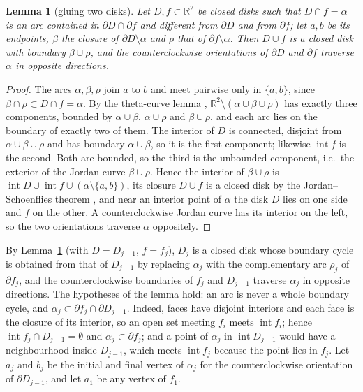 \documentclass[11pt,reqno]{amsart}
\newtheorem{lemma}[theorem]{Lemma}
\theoremstyle{definition}
\theoremstyle{remark}
\numberwithin{equation}{section}
\newcommand{\R}{\mathbb{R}}
\begin{document}
\begin{lemma}[gluing two disks]\label{lem:glue}
Let $D,f\subset\R^2$ be closed disks such that $D\cap f=\alpha$ is an arc contained in $\partial D\cap\partial f$ and different
from $\partial D$ and from $\partial f$; let $a,b$ be its endpoints, $\beta$ the closure of $\partial D\setminus\alpha$ and $\rho$
that of $\partial f\setminus\alpha$.  Then $D\cup f$ is a closed disk with boundary $\beta\cup\rho$, and the counterclockwise
orientations of $\partial D$ and $\partial f$ traverse $\alpha$ in opposite directions.
\end{lemma}
\begin{proof}
The arcs $\alpha,\beta,\rho$ join $a$ to $b$ and meet pairwise only in $\{a,b\}$, since $\beta\cap\rho\subset D\cap f=\alpha$.  By the
theta-curve lemma \cite[\S2.1]{MT}, $\R^2\setminus(\alpha\cup\beta\cup\rho)$ has exactly three components, bounded by $\alpha\cup\beta$,
$\alpha\cup\rho$ and $\beta\cup\rho$, and each arc lies on the boundary of exactly two of them.  The interior of $D$ is connected,
disjoint from $\alpha\cup\beta\cup\rho$ and has boundary $\alpha\cup\beta$, so it is the first component; likewise
$\operatorname{int}f$ is the second.  Both are bounded, so the third is the unbounded component, i.e.\ the exterior of the
Jordan curve $\beta\cup\rho$.  Hence the interior of $\beta\cup\rho$ is $\operatorname{int}D\cup\operatorname{int}f\cup(\alpha\setminus\{a,b\})$,
its closure $D\cup f$ is a closed disk by the Jordan--Schoenflies theorem \cite{Thomassen}, and near an interior point
of $\alpha$ the disk $D$ lies on one side and $f$ on the other.  A counterclockwise Jordan curve has its interior on the
left, so the two orientations traverse $\alpha$ oppositely.
\end{proof}

By Lemma~\ref{lem:glue} (with $D=D_{j-1}$, $f=f_j$), $D_j$ is a closed disk whose boundary cycle is obtained from that of
$D_{j-1}$ by replacing $\alpha_j$ with the complementary arc $\rho_j$ of $\partial f_j$, and the counterclockwise boundaries
of $f_j$ and $D_{j-1}$ traverse $\alpha_j$ in opposite directions.  The hypotheses of the lemma hold: an arc is never a whole boundary cycle, and $\alpha_j\subset\partial f_j\cap\partial D_{j-1}$.
Indeed, faces have disjoint interiors and each face is the closure of its interior, so an open set meeting $f_i$ meets
$\operatorname{int}f_i$; hence $\operatorname{int}f_j\cap D_{j-1}=\emptyset$ and $\alpha_j\subset\partial f_j$; and a point of $\alpha_j$ in
$\operatorname{int}D_{j-1}$ would have a neighbourhood inside $D_{j-1}$, which meets $\operatorname{int}f_j$ because the point lies in
$f_j$.  Let $a_j$ and $b_j$ be the initial and final vertex of
$\alpha_j$ for the counterclockwise orientation of $\partial D_{j-1}$, and let $a_1$ be any vertex of $f_1$.
\end{document}
